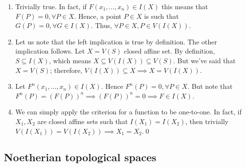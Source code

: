 \documentclass{subfiles}
\begin{document}
    \begin{proof*}
        \begin{enumerate}
            \item Trivially true. In fact, if \(F(x_{1}, \ldots, x_{n}) \in I(X)\)
                this means that \(F(P) = 0, \forall P \in X\).
                Hence, a point \(P \in X\) is such that \(G(P) = 0, \forall G \in I(X)\).
                Thus, \(\forall P \in X, P \in V(I(X))\).

            \item Let us note that the left implication is true by definition.
                The other implication follows. Let \(X = V(S)\) closed affine set.
                By definition, \(S \subseteq I(X)\), which means \(X \subseteq V(I(X)) \subseteq V(S)\).
                But we've said that \(X = V(S)\); therefore, \(V(I(X)) \subseteq X \implies X = V(I(X))\).

            \item Let \(F^{n}(x_{1}, \ldots, x_{n}) \in I(X)\).
                Hence \(F^{n}(P) = 0, \forall P \in X\).
                But note that \(F^{n}(P) =(F(P))^{n} \implies (F(P))^{n} = 0 \implies F \in I(X)\).

            \item We can simply apply the criterion for a function to be one-to-one.
                In fact, if \(X_{1}, X_{2}\) are closed affine sets such that \(I(X_{1}) = I(X_{2})\),
                then trivially \(V(I(X_{1})) = V(I(X_{2})) \implies X_{1} = X_{2}\).\qed
        \end{enumerate}
    \end{proof*}

    \subsection{Noetherian topological spaces}
    
\end{document}
